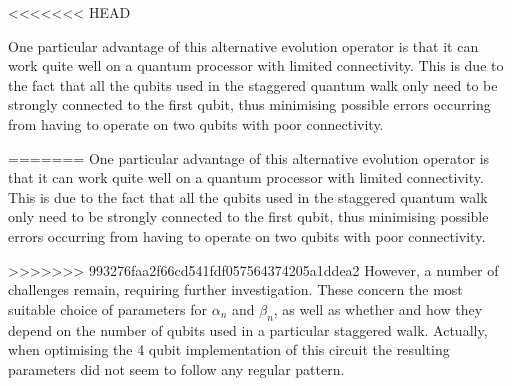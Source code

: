 <<<<<<< HEAD

One particular advantage of this alternative evolution operator is that it can work quite well on a quantum processor with  limited connectivity. This is due to the fact that all the qubits used in the staggered quantum walk only need to be strongly connected to  the first qubit, thus minimising possible errors occurring from having to operate on two qubits with poor connectivity.

=======
One particular advantage of this alternative evolution operator is that it can work quite well on a quantum processor with  limited connectivity. This is due to the fact that all the qubits used in the staggered quantum walk only need to be strongly connected to  the first qubit, thus minimising possible errors occurring from having to operate on two qubits with poor connectivity.

>>>>>>> 993276faa2f66cd541fdf057564374205a1ddea2
However, a number of challenges remain, requiring further investigation. These concern the most suitable choice of parameters for $\alpha_n$ and $\beta_n$, as well as whether and how they depend on the number of qubits used in a particular staggered walk. Actually, when optimising the 4 qubit implementation of this circuit the resulting parameters did not seem to follow any regular pattern. 



%
%
%










